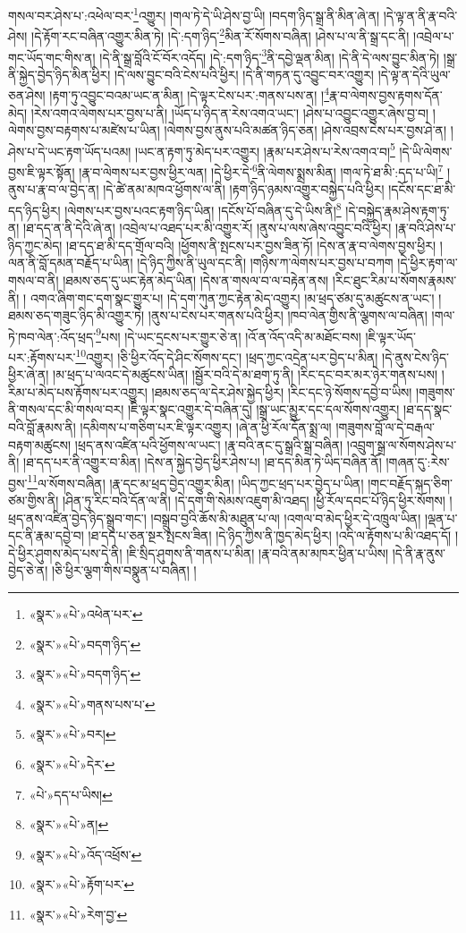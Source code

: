 གསལ་བར་ཤེས་པ་:འཕེལ་བར་\footnote{«སྣར་»«པེ་»འཕེན་པར་}འགྱུར། །གལ་ཏེ་དེ་ཡི་ཤེས་བྱ་ཡི། །བདག་ཉིད་སྒྲ་ནི་མིན་ཞེ་ན། །དེ་ལྟ་ན་ནི་རྣ་བའི་ཤེས། །དེ་རྟོག་རང་བཞིན་འགྱུར་མིན་ཏེ། །དེ་:དག་ཉིད་\footnote{«སྣར་»«པེ་»བདག་ཉིད་}མིན་རོ་སོགས་བཞིན། །ཤེས་པ་ལ་ནི་སྒྲ་དང་ནི། །འབྲེལ་པ་གང་ཡོད་གང་གིས་ན། །དེ་ནི་སྒྲ་བློའི་ངོ་བོར་འདོད། །དེ་:དག་ཉིད་\footnote{«སྣར་»«པེ་»བདག་ཉིད་}ནི་དབྱེ་ལྡན་མིན། །དེ་ནི་དེ་ལས་བྱུང་མིན་ཏེ། །སྒྲ་ནི་སྐྱེད་བྱེད་ཉིད་མིན་ཕྱིར། །དེ་ལས་བྱུང་བའི་ངེས་པའི་ཕྱིར། །དེ་ནི་གཏན་དུ་འབྱུང་བར་འགྱུར། །དེ་ལྟ་ན་དེའི་ཡུལ་ཅན་ཤེས། །རྟག་ཏུ་འབྱུང་བའམ་ཡང་ན་མིན། །དེ་ལྟར་ངེས་པར་:གནས་པས་ན། །\footnote{«སྣར་»«པེ་»གནས་པས་པ་}རྣ་བ་ལེགས་བྱས་རྟགས་དོན་མེད། །རེས་འགའ་ལེགས་པར་བྱས་པ་ནི། །ཡོད་པ་ཉིད་ན་རེས་འགའ་ཡང་། །ཤེས་པ་འབྱུང་འགྱུར་ཞེས་བྱ་བ། །ལེགས་བྱས་བརྟགས་པ་མཛེས་པ་ཡིན། །ལེགས་བྱས་ནུས་པའི་མཚན་ཉིད་ཅན། །ཤེས་འབྲས་ངེས་པར་བྱས་ཤེ་ན། །ཤེས་པ་དེ་ཡང་རྟག་ཡོད་པའམ། །ཡང་ན་རྟག་ཏུ་མེད་པར་འགྱུར། །རྣམ་པར་ཤེས་པ་རེས་འགའ་བ།\footnote{«སྣར་»«པེ་»བར།} །དེ་ཡི་ལེགས་བྱས་ཇི་ལྟར་སྟོན། །རྣ་བ་ལེགས་པར་བྱས་ཕྱིར་ལན། །དེ་ཕྱིར་དེ་\footnote{«སྣར་»«པེ་»དེར་}ནི་ལེགས་སྨྲས་མིན། །གལ་ཏེ་ཐ་མི་:དད་པ་ཡི།\footnote{«པེ་»དད་པ་ཡིས།} །ནུས་པ་རྣ་བ་ལ་བྱེད་ན། །དེ་ཚེ་ནམ་མཁའ་ཕྱོགས་ལ་ནི། །རྟག་ཉིད་ཉམས་འགྱུར་བསྐྱེད་པའི་ཕྱིར། །དངོས་དང་ཐ་མི་དད་ཉིད་ཕྱིར། །ལེགས་པར་བྱས་པའང་རྟག་ཉིད་ཡིན། །དངོས་པོ་བཞིན་དུ་དེ་ཡིས་ནི།\footnote{«སྣར་»«པེ་»ན།} །དེ་བསྐྱེད་རྣམ་ཤེས་རྟག་ཏུ་ན། །ཐ་དད་ན་ནི་དེའི་ཞེ་ན། །འབྲེལ་པ་འཐད་པར་མི་འགྱུར་རོ། །ནུས་པ་ལས་ཞེས་འབྱུང་བའི་ཕྱིར། །རྣ་བའི་ཤེས་པ་ཉིད་ཀྱང་མེད། །ཐ་དད་ཐ་མི་དད་གྲོལ་བའི། །ཕྱོགས་ནི་སྤངས་པར་བྱས་ཟིན་ཏོ། །དེས་ན་རྣ་བ་ལེགས་བྱས་ཕྱིར། །ལན་ནི་བློ་དམན་བརྗོད་པ་ཡིན། །དེ་ཉིད་ཀྱིས་ནི་ཡུལ་དང་ནི། །གཉིས་ཀ་ལེགས་པར་བྱས་པ་བཀག །དེ་ཕྱིར་རྟག་ལ་གསལ་བ་ནི། །ཐམས་ཅད་དུ་ཡང་རྟེན་མེད་ཡིན། །དེས་ན་གསལ་བ་ལ་བརྟེན་ནས། །རིང་ཐུང་རིམ་པ་སོགས་རྣམས་ནི། །
འགའ་ཞིག་གང་དག་སྣང་གྱུར་པ། །དེ་དག་ཀུན་ཀྱང་རྟེན་མེད་འགྱུར། །མ་ཕྲད་ཙམ་དུ་མཚུངས་ན་ཡང་། །ཐམས་ཅད་གཟུང་ཉིད་མི་འགྱུར་ཏེ། །ནུས་པ་ངེས་པར་གནས་པའི་ཕྱིར། །ཁབ་ལེན་གྱིས་ནི་ལྕགས་ལ་བཞིན། །གལ་ཏེ་ཁབ་ལེན་:འོད་ཕྲད་\footnote{«སྣར་»«པེ་»འོད་འཕྲོས་}པས། །དེ་ཡང་དྲངས་པར་གྱུར་ཅེ་ན། །འོ་ན་འོད་འདི་མ་མཐོང་བས། །ཇི་ལྟར་ཡོད་པར་:རྟོགས་པར་\footnote{«སྣར་»«པེ་»རྟོག་པར་}འགྱུར། །ཅི་ཕྱིར་འོད་དེ་ཤིང་སོགས་དང་། །ཕྲད་ཀྱང་འདྲེན་པར་བྱེད་པ་མིན། །དེ་ནུས་ངེས་ཉིད་ཕྱིར་ཞེ་ན། །མ་ཕྲད་པ་ལའང་དེ་མཚུངས་ཡིན། །སྦྱོར་བའི་དེ་མ་ཐག་ཏུ་ནི། །རིང་དང་བར་མར་ཉེར་གནས་པས། །རིམ་པ་མེད་པས་རྟོགས་པར་འགྱུར། །ཐམས་ཅད་ལ་དེར་ཤེས་སྐྱེད་ཕྱིར། །རིང་དང་ཉེ་སོགས་དབྱེ་བ་ཡིས། །གཟུགས་ནི་གསལ་དང་མི་གསལ་བར། །ཇི་ལྟར་སྣང་འགྱུར་དེ་བཞིན་དུ། །སྒྲ་ཡང་མྱུར་དང་དལ་སོགས་འགྱུར། །ཐ་དད་སྣང་བའི་བློ་རྣམས་ནི། །དམིགས་པ་གཅིག་པར་ཇི་ལྟར་འགྱུར། །ཞེ་ན་ཕྱི་རོལ་དོན་སྨྲ་ལ། །གཟུགས་བློ་ལ་དེ་བརྒལ་བརྟག་མཚུངས། །ཕྲད་ནས་འཛིན་པའི་ཕྱོགས་ལ་ཡང་། །རྣ་བའི་ནང་དུ་སྒྲའི་སྒྲ་བཞིན། །འབྲུག་སྒྲ་ལ་སོགས་ཤེས་པ་ནི། །ཐ་དད་པར་ནི་འགྱུར་བ་མིན། །དེས་ན་སྐྱེད་བྱེད་ཕྱིར་ཤེས་པ། །ཐ་དད་མིན་ཏེ་ཡིད་བཞིན་ནོ། །གཞན་དུ་:རེས་བྱས་\footnote{«སྣར་»«པེ་»རེག་བྱ་}ལ་སོགས་བཞིན། །རྣ་དང་མ་ཕྲད་བྱེད་འགྱུར་མིན། །ཡིད་ཀྱང་ཕྲད་པར་བྱེད་པ་ཡིན། །གང་བརྗོད་སྐད་ཅིག་ཙམ་གྱིས་ནི། །ཤིན་ཏུ་རིང་བའི་དོན་ལ་ནི། །དེ་དག་གི་སེམས་འཇུག་མི་འཐད། །ཕྱི་རོལ་དབང་པོ་ཉིད་ཕྱིར་སོགས། །ཕྲད་ནས་འཛིན་བྱེད་ཉིད་སྒྲུབ་གང་། །བསྒྲུབ་བྱའི་ཆོས་མི་མཐུན་པ་ལ། །འགལ་བ་མེད་ཕྱིར་དེ་འཁྲུལ་ཡིན། །ལྡན་པ་དང་ནི་རྣམ་དབྱེ་བ། །ཐ་དད་པ་ཅན་སྔར་སྤངས་ཟིན། །དེ་ཉིད་ཀྱིས་ནི་ཁྱད་མེད་ཕྱིར། །འདི་ལ་རྟོགས་པ་མི་འཐད་དོ། །དེ་ཕྱིར་ཤུགས་མེད་པས་དེ་ནི། །ཇི་སྲིད་ཤུགས་ནི་གནས་པ་མིན། །རྣ་བའི་ནམ་མཁར་ཕྱིན་པ་ཡིས། །དེ་ནི་རྣ་ནུས་བྱེད་ཅེ་ན། །ཅི་ཕྱིར་ལྕག་གིས་བསྣུན་པ་བཞིན། །

